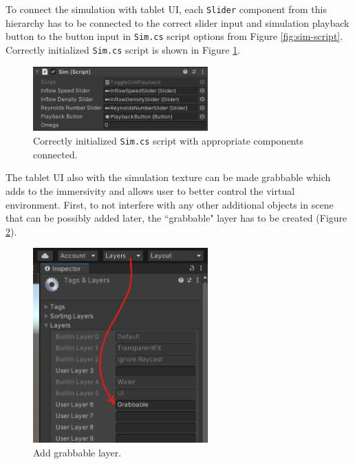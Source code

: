 To connect the simulation with tablet UI, each \texttt{Slider} component from this hierarchy has to be connected to the correct slider input and simulation playback button to the button input in \texttt{Sim.cs} script options from Figure \ref{fig:sim-script}. Correctly initialized \texttt{Sim.cs} script is shown in Figure \ref{fig:sim-script-filled}.

\begin{figure}[!ht]
	\centering
	\includegraphics[width=0.6\textwidth]{figures/sim-script-filled.png}
	\caption{Correctly initialized \texttt{Sim.cs} script with appropriate components connected.}
	\label{fig:sim-script-filled}
\end{figure}

The tablet UI also with the simulation texture can be made grabbable which adds to the immersivity and allows user to better control the virtual environment. First, to not interfere with any other additional objects in scene that can be possibly added later, the ``grabbable" layer has to be created (Figure \ref{fig:grabbable-layer}).

\begin{figure}[!ht]
	\centering
	\includegraphics[width=0.6\textwidth]{figures/edit-layers.png}
	\caption{Add grabbable layer.}
	\label{fig:grabbable-layer}
\end{figure}

